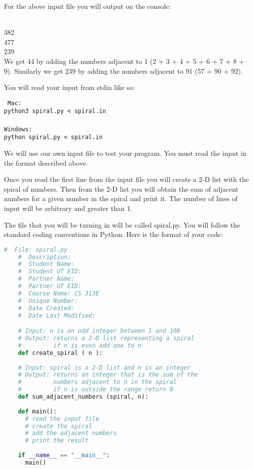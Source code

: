 \documentclass[12pt]{article}
\begin{document}
For the above input file you will output on the console:

\vspace{1cm}

 \\ 
382 \\ 
477 \\ 
239 \\ 


We get 44 by adding the numbers adjacent to 1 (2 + 3 + 4 + 5 + 6 + 7 + 8 + 9). 
Similarly we get 239 by adding the numbers adjacent to 91 (57 + 90 + 92).

You will read your input from stdin like so:

\texttt{
\noindent
Mac: \\ 
python3 spiral.py < spiral.in
\\ \\ 
Windows: \\ 
python spiral.py < spiral.in
}

We will use our own input file to test your program. You must read the input in the format described above. 

Once you read the first line from the input file you will create a 2-D list with the spiral of numbers. Then from the 2-D list you will obtain the sum of adjacent numbers for a given number in the spiral and print it. The number of lines of input will be arbitrary and greater than 1.






\newpage

The file that you will be turning in will be called spiral.py. You will follow the standard coding conventions in Python. Here is the format of your code:

\begin{lstlisting}[language=Python]
    #  File: spiral.py
    #  Description:
    #  Student Name:
    #  Student UT EID:
    #  Partner Name:
    #  Partner UT EID:
    #  Course Name: CS 313E
    #  Unique Number: 
    #  Date Created:
    #  Date Last Modified:

    # Input: n is an odd integer between 1 and 100
    # Output: returns a 2-D list representing a spiral
    #         if n is even add one to n
    def create_spiral ( n ):
    
    # Input: spiral is a 2-D list and n is an integer
    # Output: returns an integer that is the sum of the
    #         numbers adjacent to n in the spiral
    #         if n is outside the range return 0
    def sum_adjacent_numbers (spiral, n):
    
    def main():
      # read the input file    
      # create the spiral
      # add the adjacent numbers   
      # print the result
    
    if __name__ == "__main__":
      main()
\end{lstlisting}
\end{document}
